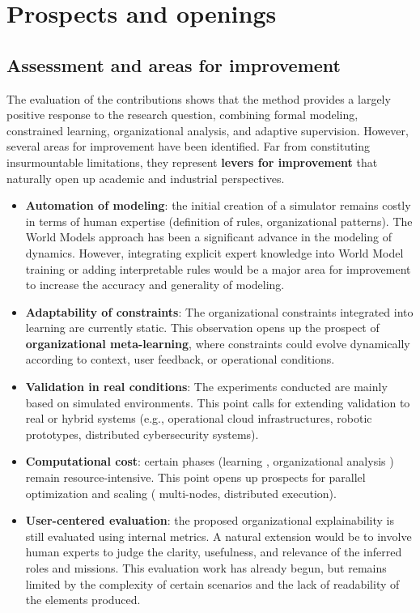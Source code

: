         \section*{Prospects and openings}
        \label{sec:perspectives}
        \subsection*{Assessment and areas for improvement}
        The evaluation of the contributions shows that the  method provides a largely positive response to the research question, combining formal modeling, constrained learning, organizational analysis, and adaptive supervision.
        However, several areas for improvement have been identified. Far from constituting insurmountable limitations, they represent \textbf{levers for improvement} that naturally open up academic and industrial perspectives.
        \begin {itemize}
  \item \textbf{Automation of modeling}: the initial creation of a simulator remains costly in terms of human expertise (definition of rules, organizational patterns). The World Models approach has been a significant advance in the modeling of dynamics. However, integrating explicit expert knowledge into World Model training or adding interpretable rules would be a major area for improvement to increase the accuracy and generality of modeling.
  \item \textbf{Adaptability of constraints}: The organizational constraints integrated into learning are currently static. This observation opens up the prospect of \textbf{organizational meta-learning}, where constraints could evolve dynamically according to context, user feedback, or operational conditions.
  \item \textbf{Validation in real conditions}: The experiments conducted are mainly based on simulated environments. This point calls for extending validation to real or hybrid systems (e.g., operational cloud infrastructures, robotic prototypes, distributed cybersecurity systems).

  \item \textbf{Computational cost}: certain phases (learning , organizational analysis ) remain resource-intensive. This point opens up prospects for parallel optimization and scaling ( multi-nodes, distributed execution).
  \item \textbf{User-centered evaluation}: the proposed organizational explainability is still evaluated using internal metrics. A natural extension would be to involve human experts to judge the clarity, usefulness, and relevance of the inferred roles and missions. This evaluation work has already begun, but remains limited by the complexity of certain scenarios and the lack of readability of the elements produced.
\end{itemize}
